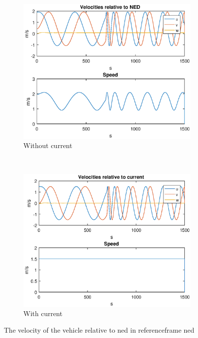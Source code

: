 \begin{figure}[!ht]
	\centering
	\begin{subfigure}[b]{0.45\textwidth}
		\includegraphics[width=\textwidth]{figures/2_6_vel_ned}
		\caption{Without current}
	\end{subfigure}
	~ %
	\begin{subfigure}[b]{0.45\textwidth}
		\includegraphics[width=\textwidth]{figures/2_6_vel_cur}
		\caption{With current}
	\end{subfigure}
	\caption{The velocity of the vehicle relative to ned  in referenceframe ned}
	\label{fig:2_6_vel}
\end{figure}









